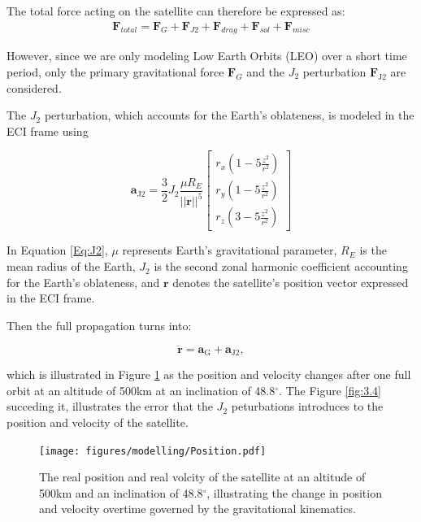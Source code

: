\noindent The total force acting on the satellite can therefore be expressed as:
\begin{align}
    \mathbf{F}_{total} = \mathbf{F}_{G} + \mathbf{F}_{J2} + \mathbf{F}_{drag} + \mathbf{F}_{sol} + \mathbf{F}_{misc}
\end{align}

\noindent However, since we are only modeling Low Earth Orbits (LEO) over a short time period, only the primary gravitational force $\mathbf{F}_G$ and the $J_2$ 
perturbation $\mathbf{F}_{\text{J2}}$ are considered.

\noindent The $J_2$ perturbation, which accounts for the Earth's oblateness, is modeled in the ECI frame using

\begin{equation}
\mathbf{a}_{\text{J2}} = \frac{3}{2}J_2\frac{\mu R_E}{||\mathbf{r}||^5}
\begin{bmatrix}r_x(1-5\frac{z^2}{r^2}) \\
 r_y(1-5\frac{z^2}{r^2})\\
 r_z(3-5\frac{z^2}{r^2}) \end{bmatrix}
\label{Eq:J2}
\end{equation}

\noindent In Equation \ref{Eq:J2}, $\mu$ represents Earth's gravitational parameter, $R_E$ is the 
mean radius of the Earth, $J_2$ is the second zonal harmonic coefficient accounting for the Earth's 
oblateness, and $\mathbf{r}$ denotes the satellite's position vector expressed in the ECI frame.

\noindent Then the full propagation turns into:

\begin{equation}
    \ddot{\mathbf{r}} = \mathbf{a}_\text{G} + \mathbf{a}_{\text{J2}},
\end{equation}

\noindent
which is illustrated in Figure \ref{fig:3.3} as the position and velocity changes after one full orbit at an altitude of 500km at an inclination of 48.8$^\circ$. The Figure \ref{fig:3.4} succeding it, illustrates the error that the $J_2$ peturbations introduces to the position and velocity of the satellite.

\begin{figure}[H]
    \centering
    \texttt{[image: figures/modelling/Position.pdf]}
    \caption{The real position and real volcity of the satellite at an altitude of 500km and an inclination of 48.8$^\circ$, illustrating the change in position and velocity overtime governed by the gravitational kinematics.}
    \label{fig:3.3}
\end{figure}

